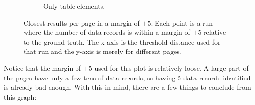 \documentclass[10pt]{article}
\begin{document}
\begin{figure}[!b]
\begin{subfigure}[b]{.49\textwidth}
    \end{subfigure}
    \begin{subfigure}[b]{.49\textwidth}
        
        \caption{Only table elements.}
        \label{fig:results-without-list}
        
    \end{subfigure}
    
    \caption{Closest results per page in a margin of $\pm 5$. Each point is a run where the number of data records is within a margin of $\pm 5$ relative to the ground truth. The x-axis is the threshold distance used for that run and the y-axis is merely for different pages.}
    \label{fig:results-in-margin}
    
\end{figure}


Notice that the margin of $\pm 5$ used for this plot is relatively loose. A large part of the pages have only a few tens of data records, so having $5$ data records identified is already bad enough. With this in mind, there are a few things to conclude from this graph:
\end{document}
